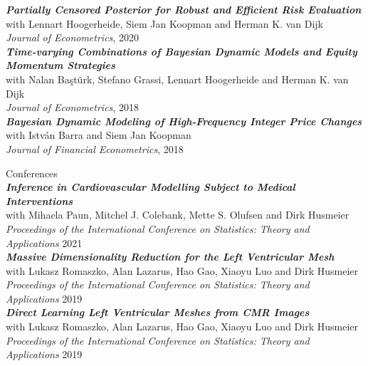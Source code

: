 \documentclass[margin,line]{resume}
\begin{document}
\begin{resume}
\textit{\textbf{Partially Censored Posterior for Robust and Efficient Risk Evaluation}}\\
	with Lennart Hoogerheide, Siem Jan Koopman and Herman K. van Dijk\\
	\textit{Journal of Econometrics}, 2020\vspace{2mm}\\ 
\textit{\textbf{Time-varying Combinations of Bayesian Dynamic Models and Equity Momentum Strategies}}\\
	with Nalan Ba\c{s}t\"{u}rk, Stefano Grassi, Lennart Hoogerheide and Herman K. van Dijk\\
	\textit{Journal of Econometrics}, 2018 \vspace{2mm} \\
\textit{\textbf{Bayesian Dynamic Modeling of High-Frequency Integer Price Changes}}\\
	with Istv\'{a}n Barra  and Siem Jan Koopman\\
	\textit{Journal of Financial Econometrics}, 2018\\ 
\vspace{-5mm}

{\mysidestyle Conferences}  \vspace{1mm}\\	
\textit{\textbf{Inference in Cardiovascular Modelling Subject to Medical Interventions}}\\
	with Mihaela Paun, Mitchel J. Colebank, Mette S. Olufsen and Dirk Husmeier\\
	\textit{Proceedings of the International Conference on Statistics: Theory and Applications} 2021  \vspace{2mm}\\
\textit{\textbf{Massive Dimensionality Reduction for the Left Ventricular Mesh}}\\
	with Lukasz Romaszko, Alan Lazarus, Hao Gao, Xiaoyu Luo and Dirk Husmeier\\
	\textit{Proceedings of the International Conference on Statistics: Theory and Applications} 2019  \vspace{2mm}\\
\textit{\textbf{Direct Learning Left Ventricular Meshes from CMR Images}}\\
	with Lukasz Romaszko, Alan Lazarus, Hao Gao, Xiaoyu Luo and Dirk Husmeier\\
	\textit{Proceedings of the International Conference on Statistics: Theory and Applications} 2019 \vspace{1mm} \\


\end{resume}
\end{document}
